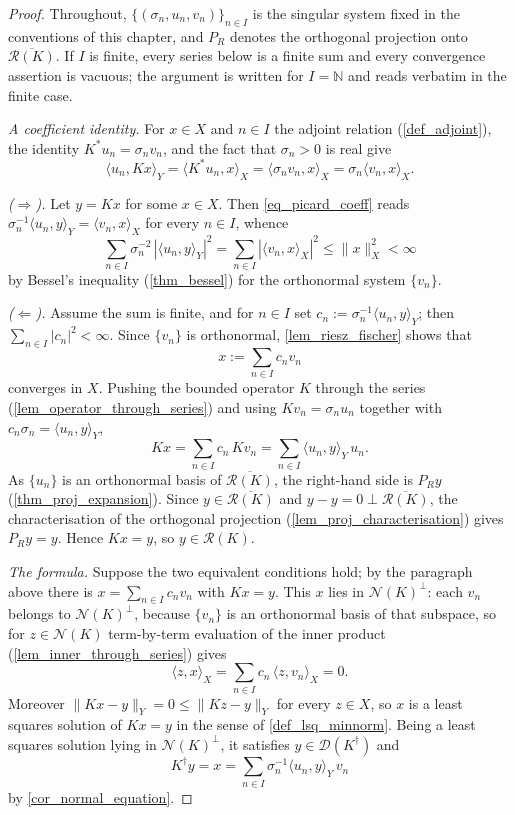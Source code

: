 \documentclass[a4paper]{report}
\theoremstyle{plain}
\theoremstyle{definition}
\theoremstyle{remark}
\newcommand{\Ran}{\mathcal{R}}
\newcommand{\Ker}{\mathcal{N}}
\newcommand{\Dom}{\mathcal{D}}
\newcommand{\dg}{^{\dagger}}
\begin{document}
\begin{proof}
  Throughout, $\{(\sigma_n, u_n, v_n)\}_{n \in I}$ is the singular system fixed in the
  conventions of this chapter, and $P_R$ denotes the orthogonal projection onto
  $\overline{\Ran(K)}$.  If $I$ is finite, every series below is a finite sum and every
  convergence assertion is vacuous; the argument is written for $I = \mathbb{N}$ and reads
  verbatim in the finite case.

  \emph{A coefficient identity.}  For $x \in X$ and $n \in I$ the adjoint relation
  (\cref{def_adjoint}), the identity $K^{*}u_n = \sigma_n v_n$, and the fact that
  $\sigma_n > 0$ is real give
  \begin{equation}\label{eq_picard_coeff}
    \langle u_n, Kx\rangle_Y = \langle K^{*}u_n, x\rangle_X
      = \langle \sigma_n v_n, x\rangle_X = \sigma_n\langle v_n, x\rangle_X .
  \end{equation}

  \emph{($\Rightarrow$).}  Let $y = Kx$ for some $x \in X$.  Then
  \eqref{eq_picard_coeff} reads $\sigma_n^{-1}\langle u_n, y\rangle_Y = \langle v_n,
  x\rangle_X$ for every $n \in I$, whence
  \[
    \sum_{n \in I}\sigma_n^{-2}\,|\langle u_n, y\rangle_Y|^{2}
      = \sum_{n \in I}|\langle v_n, x\rangle_X|^{2} \le \|x\|_X^{2} < \infty
  \]
  by Bessel's inequality (\cref{thm_bessel}) for the orthonormal system $\{v_n\}$.

  \emph{($\Leftarrow$).}  Assume the sum is finite, and for $n \in I$ set
  $c_n := \sigma_n^{-1}\langle u_n, y\rangle_Y$; then $\sum_{n \in I}|c_n|^{2} <
  \infty$.  Since $\{v_n\}$ is orthonormal, \cref{lem_riesz_fischer} shows that
  \[
    x := \sum_{n \in I} c_n v_n
  \]
  converges in $X$.  Pushing the bounded operator $K$ through the series
  (\cref{lem_operator_through_series}) and using $Kv_n = \sigma_n u_n$ together with
  $c_n\sigma_n = \langle u_n, y\rangle_Y$,
  \[
    Kx = \sum_{n \in I} c_n\,Kv_n = \sum_{n \in I}\langle u_n, y\rangle_Y\, u_n .
  \]
  As $\{u_n\}$ is an orthonormal basis of $\overline{\Ran(K)}$, the right-hand side is
  $P_R y$ (\cref{thm_proj_expansion}).  Since $y \in \overline{\Ran(K)}$ and
  $y - y = 0 \perp \overline{\Ran(K)}$, the characterisation of the orthogonal projection
  (\cref{lem_proj_characterisation}) gives $P_R y = y$.  Hence $Kx = y$, so
  $y \in \Ran(K)$.

  \emph{The formula.}  Suppose the two equivalent conditions hold; by the paragraph above
  there is $x = \sum_{n \in I}c_n v_n$ with $Kx = y$.  This $x$ lies in
  $\Ker(K)^{\perp}$: each $v_n$ belongs to $\Ker(K)^{\perp}$, because $\{v_n\}$ is an
  orthonormal basis of that subspace, so for $z \in \Ker(K)$ term-by-term evaluation of
  the inner product (\cref{lem_inner_through_series}) gives
  \[
    \langle z, x\rangle_X = \sum_{n \in I} c_n\,\langle z, v_n\rangle_X = 0 .
  \]
  Moreover $\|Kx - y\|_Y = 0 \le \|Kz - y\|_Y$ for every $z \in X$, so $x$ is a least
  squares solution of $Kx = y$ in the sense of \cref{def_lsq_minnorm}.  Being a least
  squares solution lying in $\Ker(K)^{\perp}$, it satisfies $y \in \Dom(K\dg)$ and
  \[
    K\dg y = x = \sum_{n \in I}\sigma_n^{-1}\langle u_n, y\rangle_Y\, v_n
  \]
  by \cref{cor_normal_equation}.
\end{proof}
\end{document}

